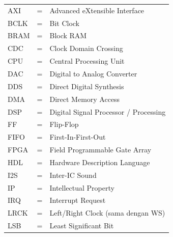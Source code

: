 \begin{center}
\end{center}

\begin{tabular}{llp{4in}}
    AXI   & \hspace{1cm} = & Advanced eXtensible Interface \\
    BCLK  & \hspace{1cm} = & Bit Clock \\
    BRAM  & \hspace{1cm} = & Block RAM \\
    CDC   & \hspace{1cm} = & Clock Domain Crossing \\
    CPU   & \hspace{1cm} = & Central Processing Unit \\
    DAC   & \hspace{1cm} = & Digital to Analog Converter \\
    DDS   & \hspace{1cm} = & Direct Digital Synthesis \\
    DMA   & \hspace{1cm} = & Direct Memory Access \\
    DSP   & \hspace{1cm} = & Digital Signal Processor / Processing \\
    FF    & \hspace{1cm} = & Flip-Flop \\
    FIFO  & \hspace{1cm} = & First-In-First-Out \\
    FPGA  & \hspace{1cm} = & Field Programmable Gate Array \\
    HDL   & \hspace{1cm} = & Hardware Description Language \\
    I2S   & \hspace{1cm} = & Inter-IC Sound \\
    IP    & \hspace{1cm} = & Intellectual Property \\
    IRQ   & \hspace{1cm} = & Interrupt Request \\
    LRCK  & \hspace{1cm} = & Left/Right Clock (sama dengan WS) \\
    LSB   & \hspace{1cm} = & Least Significant Bit \\

\end{tabular}
